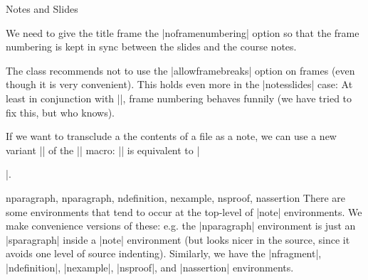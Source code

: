 \begin{sfragment}[id=sec:user:notesslides]{Notes and Slides}
\begin{dangerbox}
  We need to give the title frame the |noframenumbering| option so that the frame
  numbering is kept in sync between the slides and the course notes.
\end{dangerbox}

\begin{dangerbox}
  The  class recommends not to use the |allowframebreaks| option on frames
  (even though it is very convenient). This holds even more in the |notesslides| case: At
  least in conjunction with |\newpage|, frame numbering behaves funnily (we have tried to
  fix this, but who knows).
\end{dangerbox}
\end{sfragment}

\begin{function}{}
  If we want to transclude a the contents of a file as a note, we can use a new variant
  || of the || macro: || is equivalent to
  |\begin{note}\end{note}|.
\end{function}

\begin{environment}{nparagraph, nparagraph, ndefinition, nexample, nsproof, nassertion}
  There are some environments that tend to occur at the top-level of |note|
  environments. We make convenience versions of these: e.g. the |nparagraph| environment
  is just an |sparagraph| inside a |note| environment (but looks nicer in the source,
  since it avoids one level of source indenting). Similarly, we have the |nfragment|,
  |ndefinition|, |nexample|, |nsproof|, and |nassertion| environments.
\end{environment}

